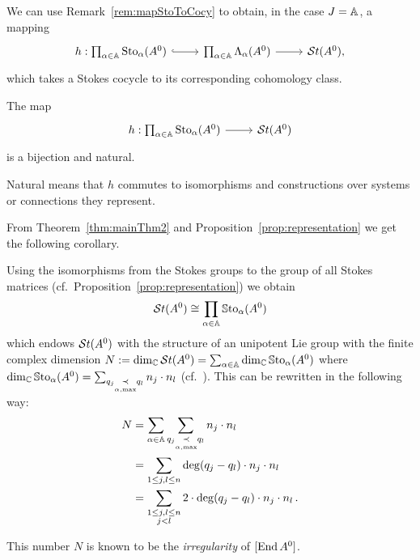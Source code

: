 We can use Remark~\ref{rem:mapStoToCocy} to obtain, in the case $J=\mathbb{A}$, a
mapping
\[ \begin{tikzcd}
    h:\prod_{\alpha\in\A}\Sto_\alpha(A^0)
    \rar[hook]&
    \prod_{\alpha\in\A}\Lambda_\alpha(A^0)
    \rar&
    \St(A^0),
\end{tikzcd} \]
which takes a Stokes cocycle to its corresponding cohomology class.
\begin{center}
  \begin{minipage}[t]{0.8\textwidth}
    \begin{tthm}\label{thm:mainThm2}
      The map
      \[ \begin{tikzcd}
          h:\prod_{\alpha\in\A}\Sto_\alpha(A^0) \rar& \St(A^0)
      \end{tikzcd} \]
      is a bijection and natural.
      \begin{s-rem}
        Natural means that $h$ commutes to isomorphisms and constructions over
        systems or connections they represent.
      \end{s-rem}
    \end{tthm}
  \end{minipage}
\end{center}
From Theorem~\ref{thm:mainThm2} and Proposition~\ref{prop:representation} we
get the following corollary.
\begin{cor}\label{cor:isomToChochN}
  Using the isomorphisms from the Stokes groups to the group of all Stokes
  matrices (cf.\ Proposition~\ref{prop:representation}) we obtain
  \[
    \mathcal{S}{}t(A^0) \cong \prod_{\alpha\in\mathbb{A}}\operatorname{\mathbb{S}to}_\alpha(A^0)
  \]
  which endows $\mathcal{S}{}t(A^0)$ with the structure of an unipotent Lie group with the
  finite complex dimension
  $N:=\dim_\mathbb{C}\mathcal{S}{}t(A^0)=\sum_{\alpha\in\mathbb{A}}\dim_\mathbb{C}\operatorname{\mathbb{S}to}_\alpha(A^0)$ where
  $\dim_\mathbb{C}\operatorname{\mathbb{S}to}_\alpha(A^0)=\sum_{q_j\underset{\alpha,\max}{\prec} q_l}
  n_j\cdot n_l$ (cf.~\cite[Sec.III.1]{Loday1994}).
  This can be rewritten in the following way:
  \begin{align*}
    N&=\sum_{\alpha\in\mathbb{A}}\sum_{q_j\underset{\alpha,\max}{\prec}q_l}n_j\cdot n_l
    \\&= \sum_{1\leq j,l\leq n}\deg(q_j-q_l)\cdot n_j\cdot n_l
    \\&=\sum_{\substack{1\leq j,l\leq n\\j<l}}2\cdot\deg(q_j-q_l)\cdot
      n_j\cdot n_l \,.
  \end{align*}
  \begin{s-rem}
    This number $N$ is known to be the \emph{irregularity} of $[\operatorname{End} A^0]$.
  \end{s-rem}
\end{cor}
